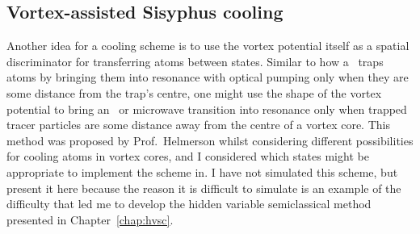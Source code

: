 \subsection{Vortex-assisted Sisyphus cooling}\label{sec:vortexcooling}

Another idea for a cooling scheme is to use the vortex potential itself as a spatial discriminator for transferring atoms between states. Similar to how a \mot\ traps atoms by bringing them into resonance with optical pumping only when they are some distance from the trap's centre, one might use the shape of the vortex potential to bring an \rf\ or microwave transition into resonance only when trapped tracer particles are some distance away from the centre of a vortex core. This method was proposed by Prof.~Helmerson whilst considering different possibilities for cooling atoms in vortex cores, and I considered which states might be appropriate to implement the scheme in. I have not simulated this scheme, but present it here because the reason it is difficult to simulate is an example of the difficulty that led me to develop the hidden variable semiclassical method presented in Chapter~\ref{chap:hvsc}.

